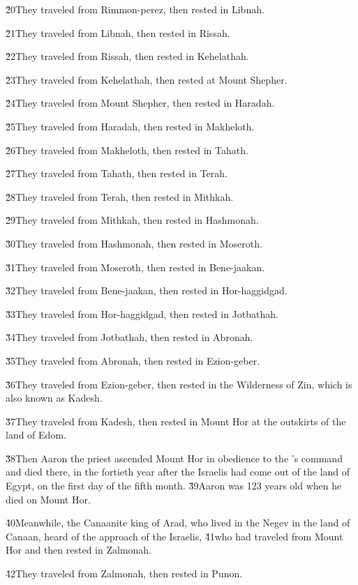 \v{20}They traveled from Rimmon-perez, then rested in Libnah.

\v{21}They traveled from Libnah, then rested in Rissah.

\v{22}They traveled from Rissah, then rested in Kehelathah.

\v{23}They traveled from Kehelathah, then rested at Mount Shepher.

\v{24}They traveled from Mount Shepher, then rested in Haradah.

\v{25}They traveled from Haradah, then rested in Makheloth.

\v{26}They traveled from Makheloth, then rested in Tahath.

\v{27}They traveled from Tahath, then rested in Terah.

\v{28}They traveled from Terah, then rested in Mithkah.

\v{29}They traveled from Mithkah, then rested in Hashmonah.

\v{30}They traveled from Hashmonah, then rested in Moseroth.

\v{31}They traveled from Moseroth, then rested in Bene-jaakan.

\v{32}They traveled from Bene-jaakan, then rested in Hor-haggidgad.

\v{33}They traveled from Hor-haggidgad, then rested in Jotbathah.

\v{34}They traveled from Jotbathah, then rested in Abronah.

\v{35}They traveled from Abronah, then rested in Ezion-geber.

\v{36}They traveled from Ezion-geber, then rested in the Wilderness of Zin, which is also known as Kadesh.

\v{37}They traveled from Kadesh, then rested in Mount Hor at the outskirts of the land of Edom.

\v{38}Then Aaron the priest ascended Mount Hor in obedience to the 's command and died there, in the fortieth year after the Israelis had come out of the land of Egypt, on the first day of the fifth month. \v{39}Aaron was 123 years old when he died on Mount Hor.

\v{40}Meanwhile, the Canaanite king of Arad, who lived in the Negev in the land of Canaan, heard of the approach of the Israelis, \v{41}who had traveled from Mount Hor and then rested in Zalmonah.

\v{42}They traveled from Zalmonah, then rested in Punon.

